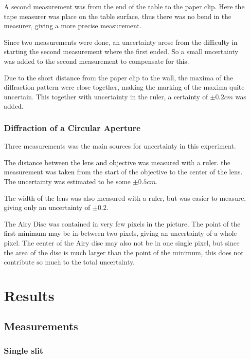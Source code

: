 \documentclass{emulateapj}
\begin{document}
A second measurement was from the end of the table to the paper clip. Here the tape measurer was place on the table surface, thus there was no bend in the measurer, giving a more precise measurement. 

Since two measurements were done, an uncertainty arose from the difficulty in starting the second measurement where the first ended. So a small uncertainty was added to the second measurement to compensate for this.

Due to the short distance from the paper clip to the wall, the maxima of the diffraction pattern were close together, making the marking of the maxima quite uncertain. This together with uncertainty in the ruler, a certainty of $\pm 0.2 cm$ was added. 

\subsubsection{Diffraction of a Circular Aperture}
Three measurements was the main sources for uncertainty in this experiment.

The distance between the lens and objective was measured with a ruler. the measurement was taken from the start of the objective to the center of the lens. The uncertainty was estimated to be some $\pm 0.5 cm$.

The width of the lens was also measured with a ruler, but was easier to measure, giving only an uncertainty of $\pm 0.2$.

The Airy Disc was contained in very few pixels in the picture. The point of the first minimum may be in-between two pixels, giving an uncertainty of a whole pixel. The center of the Airy disc may also not be in one single pixel, but since the area of the disc is much larger than the point of the minimum, this does not contribute so much to the total uncertainty.

\section{Results}
\label{sec:results}

\subsection{Measurements}
\subsubsection{Single slit}
\end{document}
